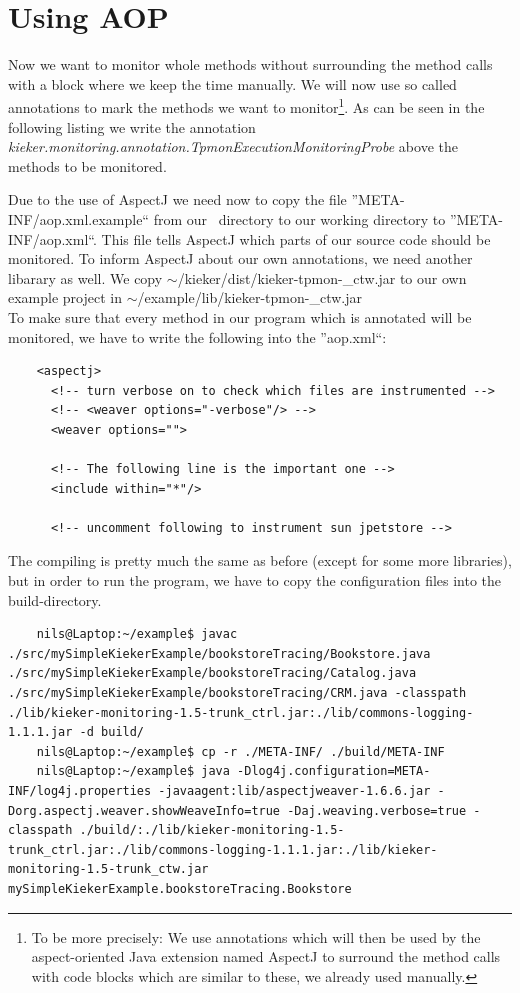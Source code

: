     \section{Using AOP}
      Now we want to monitor whole methods without surrounding the method calls with a block where we keep the time manually. We will now use so called annotations to mark the methods we want to monitor\footnote{To be more precisely: We use annotations which will then be used by the aspect-oriented Java extension named AspectJ to surround the method calls with code blocks which are similar to these, we already used manually.}. As can be seen in the following listing we write the annotation \textit{kieker.monitoring.annotation.TpmonExecutionMonitoringProbe} above the methods to be monitored. 
      \setJavaCodeListing
      \lstset{caption=Bookstore.java, label=listing:Bookstore2.java}
      
      Due to the use of AspectJ we need now to copy the file ''META-INF/aop.xml.example`` from our \Kieker\ directory to our working directory to ''META-INF/aop.xml``. This file tells AspectJ which parts of our source code should be monitored. To inform AspectJ about our own annotations, we need another libarary as well. We copy $\sim$/kieker/dist/kieker-tpmon-\version\_ctw.jar to our own example project in $\sim$/example/lib/kieker-tpmon-\version\_ctw.jar\\
      To make sure that every method in our program which is annotated will be monitored, we have to write the following into the ''aop.xml``:
      \setXMLListing 
      \begin{lstlisting}
	<aspectj>
	  <!-- turn verbose on to check which files are instrumented -->
	  <!-- <weaver options="-verbose"/> -->
	  <weaver options="">
	      
	  <!-- The following line is the important one -->
	  <include within="*"/> 

	  <!-- uncomment following to instrument sun jpetstore -->
      \end{lstlisting}
      The compiling is pretty much the same as before (except for some more libraries), but in order to run the program, we have to copy the configuration files into the build-directory.
      \begin{lstlisting}
	nils@Laptop:~/example$ javac ./src/mySimpleKiekerExample/bookstoreTracing/Bookstore.java ./src/mySimpleKiekerExample/bookstoreTracing/Catalog.java ./src/mySimpleKiekerExample/bookstoreTracing/CRM.java -classpath ./lib/kieker-monitoring-1.5-trunk_ctrl.jar:./lib/commons-logging-1.1.1.jar -d build/
	nils@Laptop:~/example$ cp -r ./META-INF/ ./build/META-INF
	nils@Laptop:~/example$ java -Dlog4j.configuration=META-INF/log4j.properties -javaagent:lib/aspectjweaver-1.6.6.jar -Dorg.aspectj.weaver.showWeaveInfo=true -Daj.weaving.verbose=true -classpath ./build/:./lib/kieker-monitoring-1.5-trunk_ctrl.jar:./lib/commons-logging-1.1.1.jar:./lib/kieker-monitoring-1.5-trunk_ctw.jar mySimpleKiekerExample.bookstoreTracing.Bookstore
      \end{lstlisting}